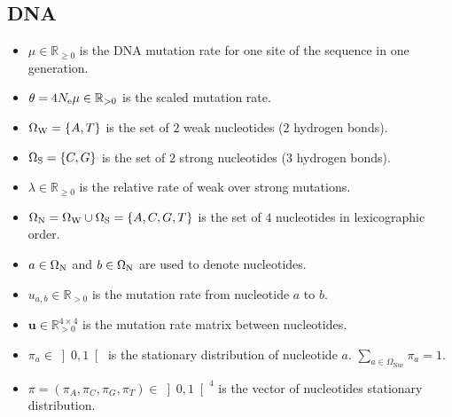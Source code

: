 \subsection{\acrshort{DNA}}
\begin{itemize}
	\item $\mu \in \mathbb{R}_{\geq 0}$ is the \acrshort{DNA} mutation rate for one site of the sequence in one generation.
	\item $\theta=4 N_{\textrm{e}} \mu \in \mathbb{R}_{>0} $ is the scaled mutation rate.
	\item $ \Omega_{\mathrm{W}} = \left\{ A,T \right\} $ is the set of $2$ weak nucleotides ($2$ hydrogen bonds).
	\item $ \Omega_{\mathrm{S}} = \left\{C,G \right\} $ is the set of $2$ strong nucleotides ($3$ hydrogen bonds).
	\item $\lambda \in \mathbb{R}_{\geq 0} $ is the relative rate of weak over strong mutations.
	\item $ \Omega_{\mathrm{N}} = \Omega_{\mathrm{W}} \cup \Omega_{\mathrm{S}} =\left\{ A,C,G,T \right\} $ is the set of $4$ nucleotides in lexicographic order.
	\item $a \in \Omega_{\mathrm{N}} $ and $b \in \Omega_{\mathrm{N}} $ are used to denote nucleotides.
	\item $u_{a,b} \in \mathbb{R}_{> 0}$ is the mutation rate from nucleotide $a$ to $b$.
	\item $\bm{u} \in \mathbb{R}_{> 0}^{4 \times 4} $ is the mutation rate matrix between nucleotides.
	\item $\pi_a \in \left]0,1\right[ $ is the stationary distribution of nucleotide $a$. $\sum_{a \in \Omega_{\mathrm{Nuc}}} \pi_a = 1$.
	\item $\pi = \left(\pi_A , \pi_C , \pi_G , \pi_T \right) \in \left]0,1\right[^4$ is the vector of nucleotides stationary distribution.
\end{itemize}


